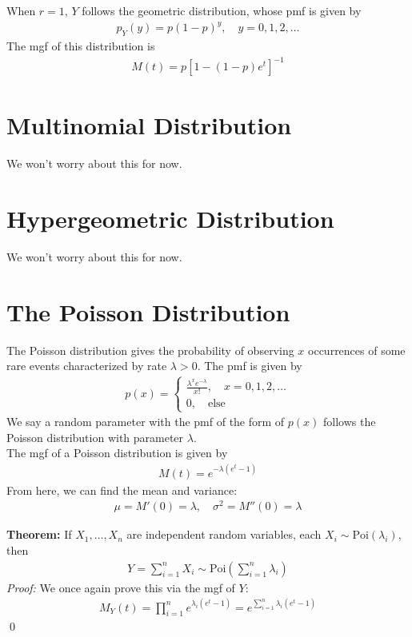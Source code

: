 \documentclass{book}
\theoremstyle{definition}
\newcommand{\f}[2]{\frac{#1}{#2}}
\newcommand{\lp}{\left(}
\newcommand{\rp}{\right)}
\begin{document}
 
When $r=1$, $Y$ follows the geometric distribution, whose pmf is given by
\begin{align}
\boxed{p_Y(y) = p(1-p)^y,\quad y = 0,1,2,\dots}
\end{align}
The mgf of this distribution is 
\begin{align}
\boxed{M(t) = p[1-(1-p)e^{t}]^{-1}}
\end{align}




\section{Multinomial Distribution}
We won't worry about this for now.
\section{Hypergeometric Distribution}
We won't worry about this for now.



\section{The Poisson Distribution}

The Poisson distribution gives the probability of observing $x$ occurrences of some rare events characterized by rate $\lambda > 0$. The pmf is given by
\begin{align}
\boxed{p(x) = \begin{cases}
	\f{\lambda^x e^{-\lambda}}{x!}, \quad x = 0,1,2,\dots\\
	0, \quad \text{else}
	\end{cases}}
\end{align}
We say a random parameter with the pmf of the form of $p(x)$ follows the Poisson distribution with parameter $\lambda$.  \\

The mgf of a Poisson distribution is given by 
\begin{align}
\boxed{M(t)= e^{-\lambda (e^t-1)}}
\end{align}
From here, we can find the mean and variance:
\begin{align}
\boxed{\mu = M'(0) = \lambda, \quad \sigma^2 = M''(0) = \lambda}
\end{align}


\noindent\textbf{Theorem:} If $X_1, \dots, X_n$ are independent random variables, each $X_i \sim \text{Poi}(\lambda_i)$, then 
\begin{align}
\boxed{Y = \sum^n_{i=1} X_i \sim \text{Poi}\lp \sum^n_{i=1}\lambda_i \rp}
\end{align}
\noindent \textit{Proof:} We once again prove this via the mgf of $Y$:
\begin{align}
M_Y(t) = \prod^n_{i=1}e^{\lambda_i (e^t-1)} = e^{\sum^n_{i=1} \lambda_i(e^t - 1)}
\end{align}
\qed
\end{document}
